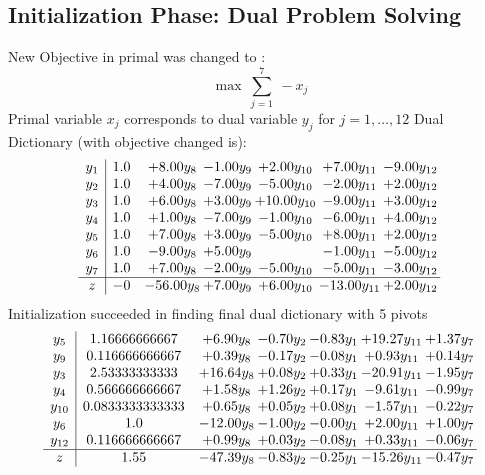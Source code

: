 \documentclass[8pt]{article}
\begin{document}
\subsection{Initialization Phase: Dual Problem Solving}
New Objective in primal was changed to : \[ \max\ \sum_{j=1}^{7}\ - x_j \] 
Primal variable $x_j$ corresponds to dual variable $y_j$ for $j = 1,\ldots,12$
Dual Dictionary (with objective changed is): 
\[\begin{array}{c| c c@{\hskip 2pt} c@{\hskip 2pt} c@{\hskip 2pt} c@{\hskip 2pt} c@{\hskip 2pt} }
 y_{1}   &  1.0 & +  8.00 y_{8} & -1.00 y_{9} & +  2.00 y_{10} & +  7.00 y_{11} & -9.00 y_{12}\\
 y_{2}   &  1.0 & +  4.00 y_{8} & -7.00 y_{9} & -5.00 y_{10} & -2.00 y_{11} & +  2.00 y_{12}\\
 y_{3}   &  1.0 & +  6.00 y_{8} & +  3.00 y_{9} & + 10.00 y_{10} & -9.00 y_{11} & +  3.00 y_{12}\\
 y_{4}   &  1.0 & +  1.00 y_{8} & -7.00 y_{9} & -1.00 y_{10} & -6.00 y_{11} & +  4.00 y_{12}\\
 y_{5}   &  1.0 & +  7.00 y_{8} & +  3.00 y_{9} & -5.00 y_{10} & +  8.00 y_{11} & +  2.00 y_{12}\\
 y_{6}   &  1.0 & -9.00 y_{8} & +  5.00 y_{9} &   & -1.00 y_{11} & -5.00 y_{12}\\
 y_{7}   &  1.0 & +  7.00 y_{8} & -2.00 y_{9} & -5.00 y_{10} & -5.00 y_{11} & -3.00 y_{12}\\
\hline
z    &  -0 & -56.00 y_{8} & +  7.00 y_{9} & +  6.00 y_{10} & -13.00 y_{11} & +  2.00 y_{12}\\
\end{array}\]
Initialization succeeded in finding final dual dictionary with 5 pivots
\[\begin{array}{c| c c@{\hskip 2pt} c@{\hskip 2pt} c@{\hskip 2pt} c@{\hskip 2pt} c@{\hskip 2pt} }
 y_{5}   &  1.16666666667 & +  6.90 y_{8} & -0.70 y_{2} & -0.83 y_{1} & + 19.27 y_{11} & +  1.37 y_{7}\\
 y_{9}   &  0.116666666667 & +  0.39 y_{8} & -0.17 y_{2} & -0.08 y_{1} & +  0.93 y_{11} & +  0.14 y_{7}\\
 y_{3}   &  2.53333333333 & + 16.64 y_{8} & +  0.08 y_{2} & +  0.33 y_{1} & -20.91 y_{11} & -1.95 y_{7}\\
 y_{4}   &  0.566666666667 & +  1.58 y_{8} & +  1.26 y_{2} & +  0.17 y_{1} & -9.61 y_{11} & -0.99 y_{7}\\
 y_{10}   &  0.0833333333333 & +  0.65 y_{8} & +  0.05 y_{2} & +  0.08 y_{1} & -1.57 y_{11} & -0.22 y_{7}\\
 y_{6}   &  1.0 & -12.00 y_{8} & -1.00 y_{2} & -0.00 y_{1} & +  2.00 y_{11} & +  1.00 y_{7}\\
 y_{12}   &  0.116666666667 & +  0.99 y_{8} & +  0.03 y_{2} & -0.08 y_{1} & +  0.33 y_{11} & -0.06 y_{7}\\
\hline
z    &  1.55 & -47.39 y_{8} & -0.83 y_{2} & -0.25 y_{1} & -15.26 y_{11} & -0.47 y_{7}\\
\end{array}\]
\end{document}

